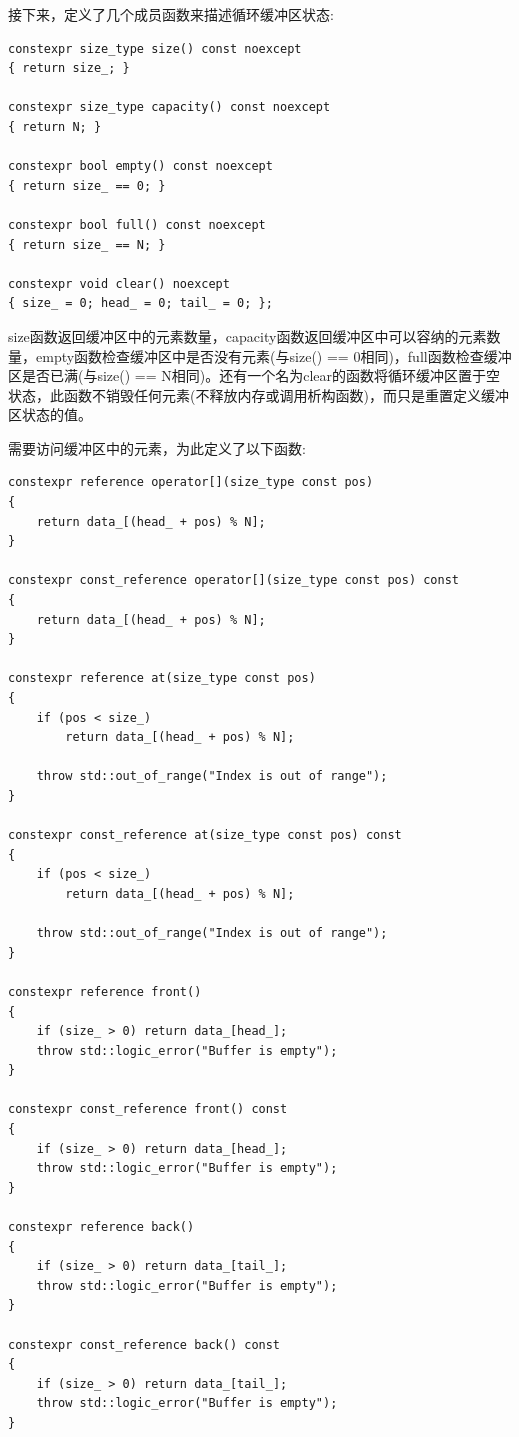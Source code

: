 接下来，定义了几个成员函数来描述循环缓冲区状态:

\begin{lstlisting}[style=styleCXX]
constexpr size_type size() const noexcept
{ return size_; }

constexpr size_type capacity() const noexcept
{ return N; }

constexpr bool empty() const noexcept
{ return size_ == 0; }

constexpr bool full() const noexcept
{ return size_ == N; }

constexpr void clear() noexcept
{ size_ = 0; head_ = 0; tail_ = 0; };
\end{lstlisting}

size函数返回缓冲区中的元素数量，capacity函数返回缓冲区中可以容纳的元素数量，empty函数检查缓冲区中是否没有元素(与size() == 0相同)，full函数检查缓冲区是否已满(与size() == N相同)。还有一个名为clear的函数将循环缓冲区置于空状态，此函数不销毁任何元素(不释放内存或调用析构函数)，而只是重置定义缓冲区状态的值。

需要访问缓冲区中的元素，为此定义了以下函数:

\begin{lstlisting}[style=styleCXX]
constexpr reference operator[](size_type const pos)
{
	return data_[(head_ + pos) % N];
}

constexpr const_reference operator[](size_type const pos) const
{
	return data_[(head_ + pos) % N];
}

constexpr reference at(size_type const pos)
{
	if (pos < size_)
		return data_[(head_ + pos) % N];
		
	throw std::out_of_range("Index is out of range");
}

constexpr const_reference at(size_type const pos) const
{
	if (pos < size_)
		return data_[(head_ + pos) % N];
		
	throw std::out_of_range("Index is out of range");
}

constexpr reference front()
{
	if (size_ > 0) return data_[head_];
	throw std::logic_error("Buffer is empty");
}

constexpr const_reference front() const
{
	if (size_ > 0) return data_[head_];
	throw std::logic_error("Buffer is empty");
}

constexpr reference back()
{
	if (size_ > 0) return data_[tail_];
	throw std::logic_error("Buffer is empty");
}

constexpr const_reference back() const
{
	if (size_ > 0) return data_[tail_];
	throw std::logic_error("Buffer is empty");
}
\end{lstlisting}

